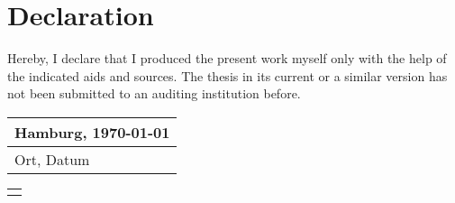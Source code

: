 \section*{Declaration}
Hereby, I declare that I produced the present work myself only with the help of the indicated aids and sources. The thesis in its current or a similar version has not been submitted to an auditing institution before.

\vspace{2cm}\noindent
\begin{tabular}{p{5cm}}
	\hspace{-5pt}Hamburg, \today \\\hline
	\hspace{-5pt}\small Ort, Datum
\end{tabular}
\hfill
\begin{tabular}{p{5cm}}
	\\\hline
	\hspace{-5pt}\small\theauthor
\end{tabular}




